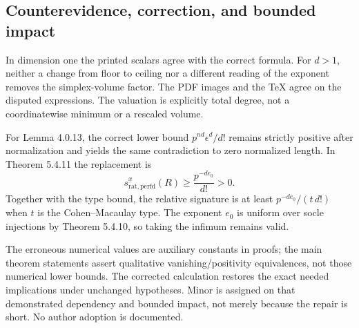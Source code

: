 \documentclass[10pt]{article}
\begin{document}
\subsection*{Counterevidence, correction, and bounded impact}
In dimension one the printed scalars agree with the correct formula. For \(d>1\), neither a change from floor to ceiling nor a different reading of the exponent removes the simplex-volume factor. The PDF images and the TeX agree on the disputed expressions. The valuation is explicitly total degree, not a coordinatewise minimum or a rescaled volume.\par
For Lemma 4.0.13, the correct lower bound \(p^{nd}\epsilon^d/d!\) remains strictly positive after normalization and yields the same contradiction to zero normalized length. In Theorem 5.4.11 the replacement is \[s_{\mathrm{rat},\mathrm{perfd}}^{\underline{x}}(R)
   \geq \frac{p^{-de_0}}{d!}>0.\] Together with the type bound, the relative signature is at least \(p^{-de_0}/(t\,d!)\) when \(t\) is the Cohen–Macaulay type. The exponent \(e_0\) is uniform over socle injections by Theorem 5.4.10, so taking the infimum remains valid.\par
The erroneous numerical values are auxiliary constants in proofs; the main theorem statements assert qualitative vanishing/positivity equivalences, not those numerical lower bounds. The corrected calculation restores the exact needed implications under unchanged hypotheses. Minor is assigned on that demonstrated dependency and bounded impact, not merely because the repair is short. No author adoption is documented.\par
\end{document}
